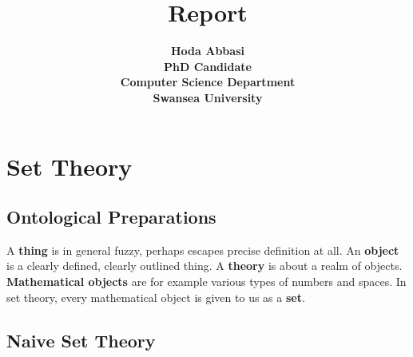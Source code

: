 \documentclass[12pt]{book}
\begin{document}
\title{\bf \Huge Report}

\author{ \bf Hoda Abbasi\\
             PhD Candidate\\
             Computer Science Department\\
             Swansea University\\}
\maketitle
\tableofcontents
\chapter{Set Theory}
\label{cha:settheory}
\section{Ontological Preparations}
\label{sec:Ontological preparations}

A \textbf{thing} is in general fuzzy, perhaps escapes precise definition at all. An \textbf{object} is a clearly defined, clearly outlined 
thing. A \textbf{theory} is about a realm of objects. \textbf{Mathematical objects} are for example various types of numbers and spaces. 
In set theory, every mathematical object is given to us as a \textbf{set}.
\section{Naive Set Theory}
\label{sec:Naivesettheory}
\end{document}
